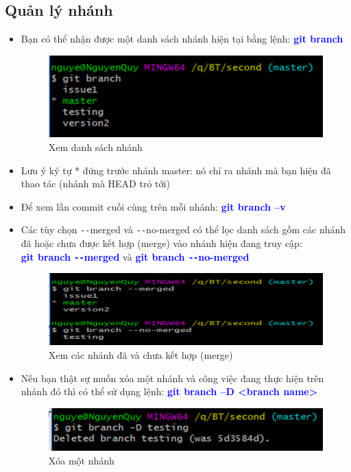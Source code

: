 \documentclass[12pt,a4paper]{report}
\begin{document}
\subsection{Quản lý nhánh}
\begin{itemize}
\item Bạn có thể nhận được một danh sách nhánh hiện tại bằng lệnh: \textcolor{blue}{\bf git branch}

\begin{figure}[!ht]
	\centering
	\includegraphics[width=0.8\linewidth]{screenshot055}
	\caption{Xem danh sách nhánh}
	\label{fig:screenshot055}
\end{figure}

\item Lưu ý ký tự * đứng trước nhánh master: nó chỉ ra nhánh mà bạn hiện đã thao tác (nhánh mà HEAD trỏ tới)
\item Để xem lần commit cuối cùng trên mỗi nhánh: \textcolor{blue}{\bf git branch –v}
\item Các tùy chọn \texttt{-{}-}merged và \texttt{-{}-}no-merged có thể lọc danh sách gồm các nhánh đã hoặc chưa được kết hợp (merge) vào nhánh hiện đang truy cập:\\ \textcolor{blue}{\bf git branch \texttt{-{}-}merged} và \textcolor{blue}{\bf git branch \texttt{-{}-}no-merged}

\begin{figure}[!ht]
	\centering
	\includegraphics[width=0.8\linewidth]{screenshot056}
\caption{Xem các nhánh đã và chưa kết hợp (merge)}
	\label{fig:screenshot056}
\end{figure}

\item Nếu bạn thật sự muốn xóa một nhánh và công việc đang thực hiện trên nhánh đó thì có thể sử dụng lệnh: \textcolor{blue}{\bf git branch –D <branch name>}

\begin{figure}[!ht]
	\centering
	\includegraphics[width=0.8\linewidth]{screenshot057}
\caption{Xóa một nhánh}
	\label{fig:screenshot057}
\end{figure}

\end{itemize}
\end{document}
